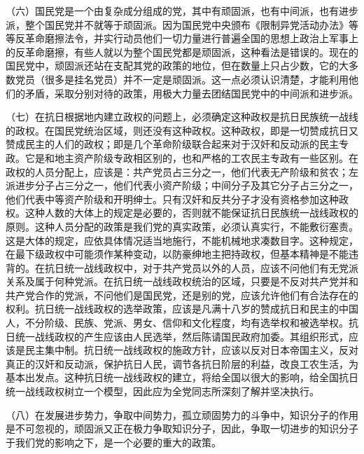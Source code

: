（六）国民党是一个由复杂成分组成的党，其中有顽固派，也有中间派，也有进步派，整个国民党并不就等于顽固派。因为国民党中央颁布《限制异党活动办法》等等反革命磨擦法令，并实行动员他们一切力量进行普遍全国的思想上政治上军事上的反革命磨擦，有些人就以为整个国民党都是顽固派，这种看法是错误的。现在的国民党中，顽固派还站在支配其党的政策的地位，但在数量上只占少数，它的大多数党员（很多是挂名党员）并不一定是顽固派。这一点必须认识清楚，才能利用他们的矛盾，采取分别对待的政策，用极大力量去团结国民党中的中间派和进步派。

（七）在抗日根据地内建立政权的问题上，必须确定这种政权是抗日民族统一战线的政权。在国民党统治区域，则还没有这种政权。这种政权，即是一切赞成抗日又赞成民主的人们的政权；即是几个革命阶级联合起来对于汉奸和反动派的民主专政。它是和地主资产阶级专政相区别的，也和严格的工农民主专政有一些区别。在政权的人员分配上，应该是：共产党员占三分之一，他们代表无产阶级和贫农；左派进步分子占三分之一，他们代表小资产阶级；中间分子及其它分子占三分之一，他们代表中等资产阶级和开明绅士。只有汉奸和反共分子才没有资格参加这种政权。这种人数的大体上的规定是必要的，否则就不能保证抗日民族统一战线政权的原则。这种人员分配的政策是我们党的真实政策，必须认真实行，不能敷衍塞责。这是大体的规定，应依具体情况适当地施行，不能机械地求凑数目字。这种规定，在最下级政权中可能须作某种变动，以防豪绅地主把持政权，但基本精神是不能违背的。在抗日统一战线政权中，对于共产党员以外的人员，应该不问他们有无党派关系及属于何种党派。在抗日统一战线政权统治的区域，只要是不反对共产党并和共产党合作的党派，不问他们是国民党，还是别的党，应该允许他们有合法存在的权利。抗日统一战线政权的选举政策，应该是凡满十八岁的赞成抗日和民主的中国人，不分阶级、民族、党派、男女、信仰和文化程度，均有选举权和被选举权。抗日统一战线政权的产生应该由人民选举，然后陈请国民政府加委。其组织形式，应该是民主集中制。抗日统一战线政权的施政方针，应该以反对日本帝国主义，反对真正的汉奸和反动派，保护抗日人民，调节各抗日阶层的利益，改良工农生活，为基本出发点。这种抗日统一战线政权的建立，将给全国以很大的影响，给全国抗日统一战线政权树立一个模型，因此应为全党同志所深刻了解并坚决执行。

（八）在发展进步势力，争取中间势力，孤立顽固势力的斗争中，知识分子的作用是不可忽视的，顽固派又正在极力争取知识分子，因此，争取一切进步的知识分子于我们党的影响之下，是一个必要的重大的政策。


